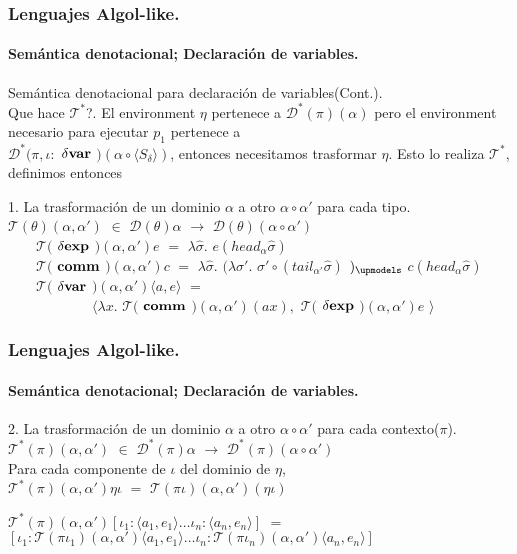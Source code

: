 \documentclass{beamer} %
\newcommand{\angles}[1]{\langle #1 \rangle}
\newcommand{\D}{\mathcal{D}}
\newcommand{\T}{\mathcal{T}}
\newcommand{\deltaexp}{\delta \bf{exp}}
\newcommand{\deltavar}{\delta \bf{var}}
\newcommand{\comm}{\bf{comm}}
\newcommand{\sigmah}{\widehat{\sigma}}
\begin{document}
\begin{frame}[shrink=1]
\frametitle{Lenguajes Algol-like.}
\framesubtitle{Sem\'antica denotacional; Declaraci\'on de variables.}

\begin{block}{Sem\'antica denotacional para declaraci\'on de variables(Cont.). \\ Que hace $\T^{*}$?.}\small
El environment $\eta$ pertenece a $\D^{*}(\pi)(\alpha)$ pero el environment necesario para ejecutar $p_1$ pertenece a \\
$\D^{*}(\pi,\iota :$ $\deltavar$ $)(\alpha \circ \angles{S_\delta})$, entonces necesitamos trasformar $\eta$.
Esto lo realiza $\T^{*}$, definimos entonces
\end{block}
\begin{block}{1. La trasformaci\'on de un dominio $\alpha$ a otro $\alpha \circ \alpha'$ para cada tipo.}
\ \ \ \ $\T(\theta)(\alpha,\alpha')$ $\in$ $\D(\theta)\alpha$ $\rightarrow$ $\D(\theta)(\alpha \circ \alpha')$\\



\ \ \ \ $\T($ $\deltaexp$ $)(\alpha,\alpha')e$ $=$ $\lambda \sigmah .$ $e(head_{\alpha}\sigmah)$\\



\ \ \ \ $\T($ $\comm$ $)(\alpha,\alpha')c$ $=$ 
$\lambda \sigmah .$ $(\lambda \sigma' .$ $\sigma' \circ (tail_{\alpha'}\sigmah)$ $)_{\upmodels}$ $c(head_{\alpha}\sigmah)$\\

\ \ \ \ $\T($ $\deltavar$ $)(\alpha,\alpha')\angles{a,e}$ $=$ \\
\ \ \ \ \ \ \ \ \ \ \ \ $\angles{\lambda x.$ $\T($ $\comm$ $)(\alpha,\alpha')(a x),$ $\T($ $\deltaexp$ $)(\alpha,\alpha')e$ $}$
\end{block}
\end{frame}


\begin{frame}[shrink=1]
\frametitle{Lenguajes Algol-like.}
\framesubtitle{Sem\'antica denotacional; Declaraci\'on de variables.}

\begin{block}{2. La trasformaci\'on de un dominio $\alpha$ a otro $\alpha \circ \alpha'$ para cada contexto($\pi$).}
\ \ \ \ $\T^{*}(\pi)(\alpha,\alpha')$ $\in$ $\D^{*}(\pi)\alpha$ $\rightarrow$ $\D^{*}(\pi)(\alpha \circ \alpha')$\\

Para cada componente de $\iota$ del dominio de $\eta$, \\
$\T^{*}(\pi)(\alpha,\alpha')\eta\iota$ $=$ $\T(\pi\iota)(\alpha,\alpha')(\eta\iota)$ 
\end{block}

\begin{block}{}
$\T^{*}(\pi)(\alpha,\alpha')[\iota_1:\angles{a_1,e_1} \ldots \iota_n:\angles{a_n,e_n}]$ $=$ \\

$[\iota_1:\T(\pi\iota_1)(\alpha,\alpha')\angles{a_1,e_1} \ldots \iota_n:\T(\pi\iota_n)(\alpha,\alpha')\angles{a_n,e_n}]$
\end{block}

\end{frame}
\end{document}
